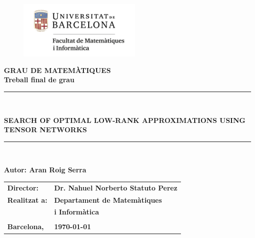 \documentclass[11pt,a4paper,openright,oneside]{book}
\numberwithin{equation}{section}
\begin{document}



\thispagestyle{empty}

\begin{titlepage}
\begin{center}
\begin{figure}[htb]
\begin{center}
\includegraphics[width=6cm]{matematiquesinformatica-pos-rgb.png}
\end{center}
\end{figure}

\vspace*{1cm}
\textbf{\LARGE GRAU DE MATEM\`{A}TIQUES } \\
\vspace*{.5cm}
\textbf{\LARGE Treball final de grau} \\

\vspace*{1.5cm}
\rule{16cm}{0.1mm}\\
\begin{Huge}
\textbf{SEARCH OF OPTIMAL LOW-RANK APPROXIMATIONS USING TENSOR NETWORKS} \\
\end{Huge}
\rule{16cm}{0.1mm}\\

\vspace{1cm}

\begin{flushright}
\textbf{\LARGE Autor: Aran Roig Serra}

\vspace*{2cm}

\renewcommand{\arraystretch}{1.5}
\begin{tabular}{ll}
\textbf{\Large Director:} & \textbf{\Large Dr. Nahuel Norberto Statuto Perez} \\
\textbf{\Large Realitzat a:} & \textbf{\Large  Departament de Matemàtiques   } \\
 & \textbf{\Large i Informàtica} \\
\\
\textbf{\Large Barcelona,} & \textbf{\Large \today }
\end{tabular}

\end{flushright}

\end{center}



\end{titlepage}
\end{document}
